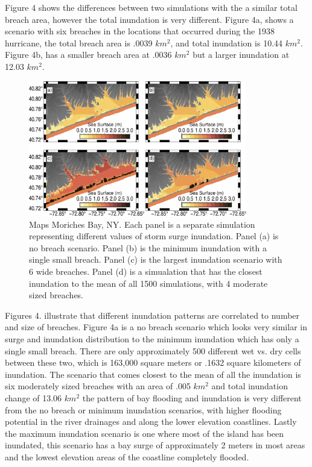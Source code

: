 \documentclass{coastal_paper}
\begin{document}
Figure 4 shows the differences between two simulations with the a similar total breach area, however the total inundation is very different. Figure 4a, shows a scenario with six breaches in the locations that occurred during the 1938 hurricane, the total breach area is .0039 $km^2$, and total inundation is 10.44 $km^2$. Figure 4b, has a smaller breach area at .0036 $km^2$ but a larger inundation at 12.03 $km^2$.

\begin{figure}
    \centering
    \includegraphics[width=0.85\textwidth]{min_max_mean_inundation.pdf}
    \caption{Maps Moriches Bay, NY. Each panel is a separate simulation representing different values of storm surge inundation. Panel (a) is no breach scenario. Panel (b) is the minimum inundation with a single small breach. Panel (c) is the largest inundation scenario with 6 wide breaches. Panel (d)  is a simualation that has the closest inundation to the mean of all 1500 simulations, with 4 moderate sized breaches.}
    \label{fig4}
\end{figure}

Figures 4. illustrate that different inundation patterns are correlated to number and size of breaches. Figure 4a is a no breach scenario which looks very similar in surge and inundation distribution to the minimum inundation which has only a single small breach. There are only approximately 500 different wet vs. dry cells between these two, which is 163,000 square meters or .1632 square kilometers of inundation. The scenario that comes closest to the mean of all the inundation is six moderately sized breaches with an area of .005 $km^2$ and total inundation change of 13.06 $km^2$ the pattern of bay flooding and inundation is very different from the no breach or minimum inundation scenarios, with higher flooding potential in the river drainages and along the lower elevation coastlines. Lastly the maximum inundation scenario is one where most of the island has been inundated, this scenario has a bay surge of approximately 2 meters in most areas and the lowest elevation areas of the coastline completely flooded.
\end{document}
